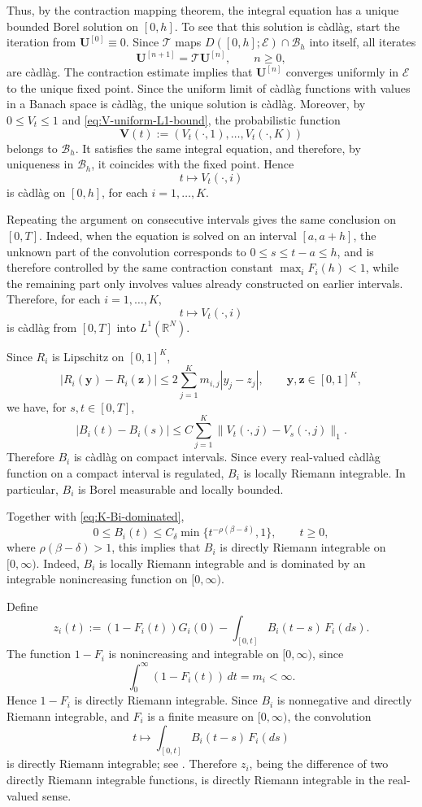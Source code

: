 \documentclass[reqno,final,11pt]{amsart}
\newcommand{\1}{\mathbbm{1}}
\renewcommand{\cite}{\citet}
\theoremstyle{plain}
\theoremstyle{definition}
\theoremstyle{remark}
\begin{document}
 
 
Thus, by the contraction mapping theorem, the integral equation has a unique
bounded Borel solution on \([0,h]\). To see that this solution is càdlàg,
start the iteration from \(\mathbf U^{[0]}\equiv0\). Since \(\mathcal T\) maps
\(D([0,h];\mathcal E)\cap\mathcal B_h\) into itself, all iterates
\[
\mathbf U^{[n+1]}=\mathcal T\mathbf U^{[n]},\qquad n\ge0,
\]
are càdlàg. The contraction estimate implies that \(\mathbf U^{[n]}\) converges
uniformly in \(\mathcal E\) to the unique fixed point. Since the uniform limit
of càdlàg functions with values in a Banach space is càdlàg, the unique
solution is càdlàg. Moreover, by \(0\le V_t\le1\) and \eqref{eq:V-uniform-L1-bound}, the
probabilistic function
\[
\mathbf V(t):=(V_t(\cdot,1),\ldots,V_t(\cdot,K))
\]
belongs to \(\mathcal B_h\). It satisfies the same integral equation, and
therefore, by uniqueness in \(\mathcal B_h\), it coincides with the fixed
point. Hence
\[
t\mapsto V_t(\cdot,i)
\]
is càdlàg on \([0,h]\), for each \(i=1,\ldots,K\).

Repeating the argument on consecutive intervals gives the same conclusion on
\([0,T]\). Indeed, when the equation is solved on an interval \([a,a+h]\),
the unknown part of the convolution corresponds to \(0\le s\le t-a\le h\),
and is therefore controlled by the same contraction constant
\(\max_iF_i(h)<1\), while the remaining part only involves values already
constructed on earlier intervals. Therefore, for each \(i=1,\ldots,K\),
\[
t\mapsto V_t(\cdot,i)
\]
is càdlàg from \([0,T]\) into \(L^1(\mathbb R^N)\).

Since \(R_i\) is Lipschitz on \([0,1]^K\),
\[
|R_i(\mathbf y)-R_i(\mathbf z)|
\le
2\sum_{j=1}^K m_{i,j}|y_j-z_j|,
\qquad
\mathbf y,\mathbf z\in[0,1]^K,
\]
we have, for \(s,t\in[0,T]\),
\[
|B_i(t)-B_i(s)|
\le
C\sum_{j=1}^K
\|V_t(\cdot,j)-V_s(\cdot,j)\|_1 .
\]
Therefore \(B_i\) is càdlàg on compact intervals. Since every real-valued
càdlàg function on a compact interval is regulated, \(B_i\) is locally
Riemann integrable. In particular, \(B_i\) is Borel measurable and locally
bounded.

Together with \eqref{eq:K-Bi-dominated},
\[
0\le B_i(t)
\le
C_\delta \min\{t^{-\rho(\beta-\delta)},1\},
\qquad t\ge0,
\]
where \(\rho(\beta-\delta)>1\), this implies that \(B_i\) is directly Riemann
integrable on \([0,\infty)\). Indeed, \(B_i\) is locally Riemann integrable
and is dominated by an integrable nonincreasing function on \([0,\infty)\).

Define
\[
z_i(t)
:=
(1-F_i(t))G_i(0)
-
\int_{[0,t]}B_i(t-s)\,F_i(ds).
\]
The function \(1-F_i\) is nonincreasing and integrable on \([0,\infty)\),
since
\[
\int_0^\infty (1-F_i(t))\,dt=m_i<\infty.
\]
Hence \(1-F_i\) is directly Riemann integrable. Since \(B_i\) is nonnegative
and directly Riemann integrable, and \(F_i\) is a finite measure on
\([0,\infty)\), the convolution
\[
t\mapsto
\int_{[0,t]}B_i(t-s)\,F_i(ds)
\]
is directly Riemann integrable; see \cite[Theorem~1]{Sgibnev2023}.
Therefore \(z_i\), being the difference of two directly Riemann integrable
functions, is directly Riemann integrable in the real-valued sense.
\end{document}
